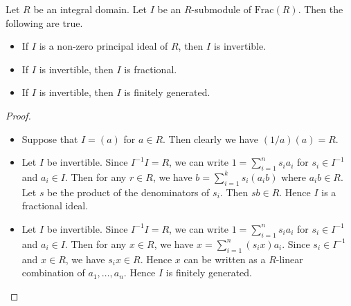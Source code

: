 \documentclass[a4paper]{article}
\begin{document}
\begin{prp}{}{} Let $R$ be an integral domain. Let $I$ be an $R$-submodule of $\text{Frac}(R)$. Then the following are true. 
\begin{itemize}
\item If $I$ is a non-zero principal ideal of $R$, then $I$ is invertible. 
\item If $I$ is invertible, then $I$ is fractional. 
\item If $I$ is invertible, then $I$ is finitely generated. 
\end{itemize} 
\begin{proof}\\
\begin{itemize}
\item Suppose that $I=(a)$ for $a\in R$. Then clearly we have $(1/a)(a)=R$. 
\item Let $I$ be invertible. Since $I^{-1}I=R$, we can write $1=\sum_{i=1}^ns_ia_i$ for $s_i\in I^{-1}$ and $a_i\in I$. Then for any $r\in R$, we have $b=\sum_{i=1}^ks_i(a_ib)$ where $a_ib\in R$. Let $s$ be the product of the denominators of $s_i$. Then $sb\in R$. Hence $I$ is a fractional ideal. 
\item Let $I$ be invertible. Since $I^{-1}I=R$, we can write $1=\sum_{i=1}^ns_ia_i$ for $s_i\in I^{-1}$ and $a_i\in I$. Then for any $x\in R$, we have $x=\sum_{i=1}^n(s_ix)a_i$. Since $s_i\in I^{-1}$ and $x\in R$, we have $s_ix\in R$. Hence $x$ can be written as a $R$-linear combination of $a_1,\dots,a_n$. Hence $I$ is finitely generated. 
\end{itemize}
\end{proof}
\end{prp}
\end{document}
